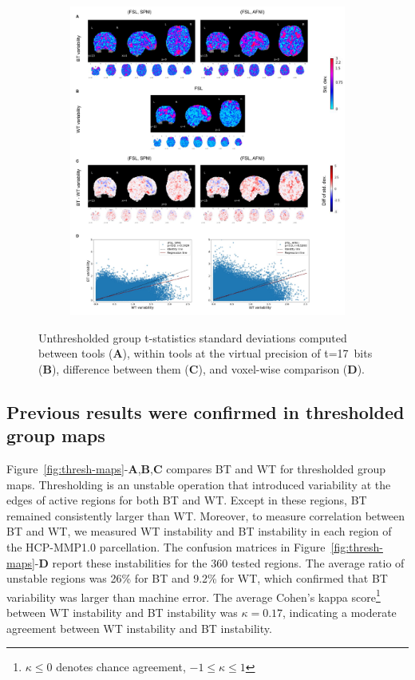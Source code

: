 \documentclass[11pt,onecolumn]{article}
\begin{document}
  \begin{figure}[ht]
      \begin{subfigure}[ht]{\textwidth}
        \centering
        \includegraphics[width=.75\textwidth]{figures/bg_global_precision.pdf}
        \end{subfigure}
        \caption{Unthresholded group t-statistics standard deviations computed between tools (\textbf{A}),
          within tools at the virtual precision of t=17~bits (\textbf{B}), difference between them (\textbf{C}), and 
          voxel-wise comparison (\textbf{D}).}
    \label{fig:gnp-mni}
  \end{figure}


  \subsection{Previous results were confirmed in thresholded group maps}

  Figure~\ref{fig:thresh-maps}-\textbf{A},\textbf{B},\textbf{C} compares BT
  and WT for thresholded group maps. Thresholding is an unstable operation
  that introduced variability at the edges of
  active regions for both BT and WT. Except in these regions, BT remained consistently larger
  than WT. Moreover, to measure correlation between BT and WT, we
  measured WT instability and BT instability in each region of the
  HCP-MMP1.0 parcellation. The confusion matrices in
  Figure~\ref{fig:thresh-maps}-\textbf{D} report these instabilities for
  the 360 tested regions. The average ratio of unstable regions was 26\%
  for BT and 9.2\% for WT, which confirmed that BT variability was larger than machine error.
  The average Cohen's kappa score\footnote{$\kappa \leq 0$ denotes chance agreement, $-1 \leq \kappa \leq 1$}
   between WT instability and BT instability was $\kappa=0.17$, indicating 
  a moderate agreement between WT instability and BT instability.
\end{document}
